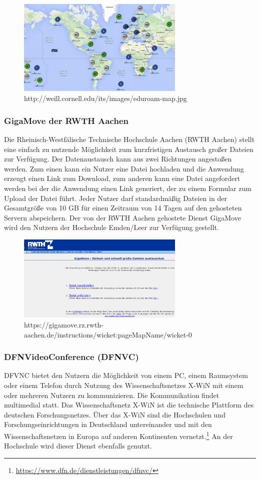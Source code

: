 \begin{figure}[h!]
	\centering
	\includegraphics[width=8cm]{kapitel/gruppe2/bilder/eduroam_map}
	\caption{http://weill.cornell.edu/its/images/eduroam-map.jpg}
	\label{fig_map_eduroam}
\end{figure}

\subsubsection{GigaMove der RWTH Aachen}
Die Rheinisch-Westfälische Technische Hochschule Aachen (RWTH Aachen) stellt eine einfach zu nutzende Möglichkeit  zum kurzfristigen Austausch großer Dateien zur Verfügung. Der Datenaustausch kann aus zwei Richtungen angestoßen werden. Zum einen kann ein Nutzer eine Datei hochladen und die Anwendung erzeugt einen Link zum Download, zum anderen kann eine Datei angefordert werden bei der die Anwendung einen Link generiert, der zu einem Formular zum Upload der Datei führt. Jeder Nutzer darf standardmäßig Dateien in der Gesamtgröße von 10 GB für einen Zeitraum von 14 Tagen auf den gehosteten Servern abspeichern. Der von der RWTH Aachen gehostete Dienst GigaMove wird den Nutzern der Hochschule Emden/Leer zur Verfügung gestellt.

\begin{figure}
	\centering
	\includegraphics[width=8cm]{kapitel/gruppe2/bilder/rwth_gigamove}
	\caption{https://gigamove.rz.rwth-aachen.de/instructions/wicket:pageMapName/wicket-0}
	\label{fig_rwth_gigamove}
\end{figure}

\subsubsection{DFNVideoConference (DFNVC)}
DFVNC bietet den Nutzern die Möglichkeit von einem PC, einem Raumsystem oder einem Telefon durch Nutzung des Wissenschaftsnetzes X-WiN mit einem oder mehreren Nutzern zu kommunizieren. Die Kommunikation findet multimedial statt. Das Wissenschaftsnetz X-WiN ist die technische Plattform des deutschen Forschungsnetzes. Über das X-WiN sind die Hochschulen und Forschungseinrichtungen in Deutschland untereinander und mit den Wissenschaftsnetzen in Europa auf anderen Kontinenten vernetzt.\footnote{\url{https://www.dfn.de/dienstleistungen/dfnvc/}} An der Hochschule wird dieser Dienst ebenfalls genutzt.

